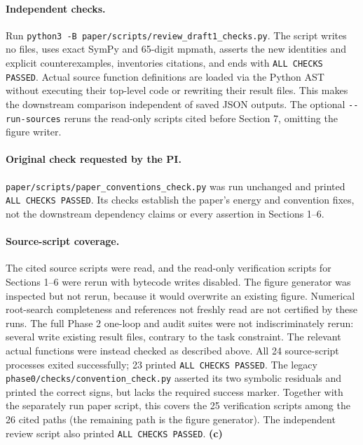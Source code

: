 \documentclass[11pt,a4paper]{article}
\newcommand{\C}{\textsf{\textbf{(c)}}}
\newcommand{\file}[1]{\nolinkurl{#1}}
\begin{document}
\paragraph{Independent checks.}
Run \file{python3 -B paper/scripts/review_draft1_checks.py}.
The script writes no files, uses exact SymPy and 65-digit mpmath, asserts
the new identities and explicit counterexamples, inventories citations,
and ends with \file{ALL CHECKS PASSED}. Actual source function definitions
are loaded via the Python AST without executing their top-level code or
rewriting their result files. This makes the downstream comparison
independent of saved JSON outputs. The optional \file{--run-sources} reruns
the read-only scripts cited before Section 7, omitting the figure writer.

\paragraph{Original check requested by the PI.}
\file{paper/scripts/paper_conventions_check.py} was run unchanged and printed
\file{ALL CHECKS PASSED}. Its checks establish the paper's energy and
convention fixes, not the downstream dependency claims or every assertion
in Sections 1--6.

\paragraph{Source-script coverage.}
The cited source scripts were read, and the read-only verification scripts
for Sections 1--6 were rerun with bytecode writes disabled. The figure
generator was inspected but not rerun, because it would overwrite an
existing figure. Numerical root-search completeness and references not
freshly read are not certified by these runs. The full Phase 2 one-loop and
audit suites were not indiscriminately rerun: several write existing result
files, contrary to the task constraint. The relevant actual functions were
instead checked as described above. All 24 source-script processes exited
successfully; 23 printed \file{ALL CHECKS PASSED}. The legacy
\file{phase0/checks/convention_check.py} asserted its two symbolic residuals
and printed the correct signs, but lacks the required success marker.
Together with the separately run paper script, this covers the 25
verification scripts among the 26 cited paths (the remaining path is the
figure generator). The independent review script also printed
\file{ALL CHECKS PASSED}. \C
\end{document}
